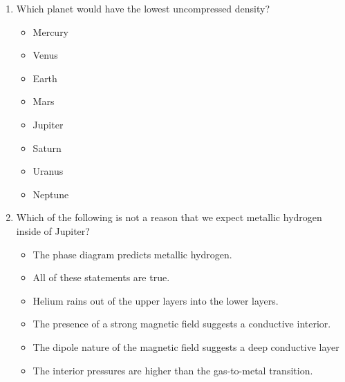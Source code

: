 \begin{enumerate}
\item[1.] Which planet would have the lowest uncompressed density?
    \begin{multicols}{4}
    \begin{itemize}[label={$\bullet$}]
        \item Mercury
        \item Venus
        \item Earth
        \item Mars
        \item Jupiter
        \item Saturn
        \item  Uranus
        \item  Neptune
    \end{itemize}
    \end{multicols}

\item[2.] Which of the following is  not  a reason that we expect metallic hydrogen inside of Jupiter?
    \begin{multicols}{2}   
    \begin{itemize}[label={$\bullet$}]
        \item The phase diagram predicts metallic hydrogen.
        \item All of these statements are true.
        \item Helium rains out of the upper layers into the lower layers.
        \item The presence of a strong magnetic field suggests a conductive interior.
        \item The dipole nature of the magnetic field suggests a deep conductive layer
        \item The interior pressures are higher than the gas-to-metal transition.
    \end{itemize}
    \end{multicols}


\end{enumerate}
